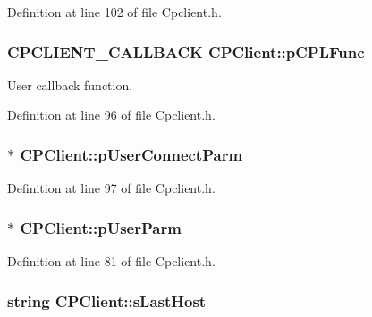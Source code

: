 \-Definition at line 102 of file \-Cpclient.\-h.

\hypertarget{class_c_p_client_a4ebdee1edb46b01abdc6a813d709b0b3}{
\subsubsection[{p\-C\-P\-L\-Func}]{\setlength{\rightskip}{0pt plus 5cm}\-C\-P\-C\-L\-I\-E\-N\-T\-\_\-\-C\-A\-L\-L\-B\-A\-C\-K {\bf \-C\-P\-Client\-::p\-C\-P\-L\-Func}}}\label{class_c_p_client_a4ebdee1edb46b01abdc6a813d709b0b3}


\-User callback function. 



\-Definition at line 96 of file \-Cpclient.\-h.

\hypertarget{class_c_p_client_a5eb090c6230b60ebcaf56228746af7f0}{
\subsubsection[{p\-User\-Connect\-Parm}]{$\ast$ {\bf \-C\-P\-Client\-::p\-User\-Connect\-Parm}}}\label{class_c_p_client_a5eb090c6230b60ebcaf56228746af7f0}


\-Definition at line 97 of file \-Cpclient.\-h.

\hypertarget{class_c_p_client_a4c7f8139f898544073f5e535d5022ae6}{
\subsubsection[{p\-User\-Parm}]{$\ast$ {\bf \-C\-P\-Client\-::p\-User\-Parm}}}\label{class_c_p_client_a4c7f8139f898544073f5e535d5022ae6}


\-Definition at line 81 of file \-Cpclient.\-h.

\hypertarget{class_c_p_client_ac07c25a192add6cf72a751608e1891ad}{
\subsubsection[{s\-Last\-Host}]{\setlength{\rightskip}{0pt plus 5cm}string {\bf \-C\-P\-Client\-::s\-Last\-Host}}}\label{class_c_p_client_ac07c25a192add6cf72a751608e1891ad}


